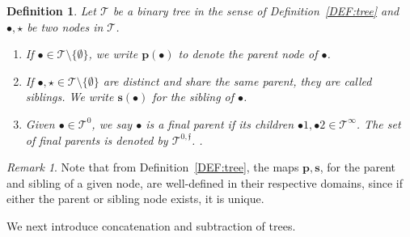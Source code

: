 \documentclass[a4paper,
11pt,  reqno]{amsart}
\newcommand{\5}{\textup{V}}
\newtheorem{definition}[theorem]{Definition}
\theoremstyle{remark}
\newtheorem{remark}[theorem]{Remark}
\newcommand{\bul}{\bullet}
\newcommand{\TT}{\mathcal{T}}
\newcommand{\pb}{\mathbf{p}}
\newcommand{\sbf}{\mathbf{s}}
\newcommand{\ff}{\mathfrak{f}}
\numberwithin{equation}{section}
\numberwithin{theorem}{section}
\begin{document}
\begin{definition}\rm
\label{DEF:tree2}
Let $\TT$ be a binary tree in the sense of Definition~\ref{DEF:tree} and 
$\bul, \star$ be two nodes in $\TT$. 

\begin{enumerate}



\smallskip
\item[(i)]
If $\bul \in \TT\setminus \{ \emptyset\}$, we write $\pb(\bul)$ to denote the \emph{parent node} of $\bul$.

\smallskip
\item[(ii)] 
If $\bul, \star\in \TT \setminus\{ \emptyset \}$ are distinct and share the same parent, they are called \textit{siblings}. We write $\sbf(\bul)$ for the sibling of $\bul$. 

\smallskip
\item[(iii)] 
Given $\bul\in \TT^0$, we say $\bul$ is a \textit{final parent} if its children $\bul1, \bul2 \in \TT^\infty$. The set of final parents is denoted by $\TT^{0,\ff}$.
. 

\end{enumerate}



\end{definition}


\begin{remark}\rm 
Note that from Definition~\ref{DEF:tree}, the maps $\pb, \sbf$, for the parent and sibling of a given node, are well-defined in their respective domains, since if either the parent or sibling node exists, it is unique. 

\end{remark}





We next introduce concatenation and subtraction of trees. 
\end{document}
